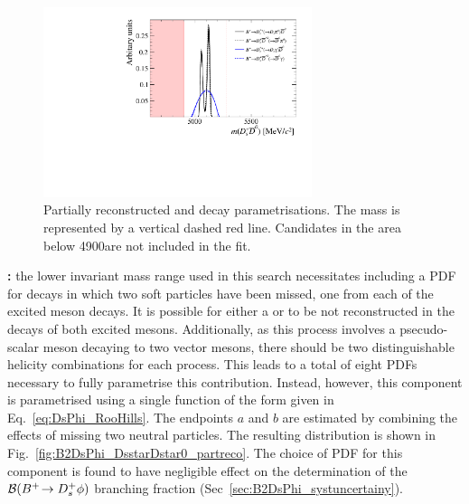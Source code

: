 \begin{figure}[!h]
    \centering
    \includegraphics[width=0.70\textwidth]{figs/B2DsPhi/DsD0_part_reco_Shapes.pdf}
    \caption{Partially reconstructed \decay{\Bp}{\Dsp\Dstarzb} and \decay{\Bp}{\Dssp\Dzb} decay parametrisations. The \Bp mass is represented by a vertical dashed red line. Candidates in the area below 4900\mevcc are not included in the fit.}
    \label{fig:B2DsPhi_DsD0_partreco}   
\end{figure}


\begin{description}

\item \textbf{\decay{\Bp}{\Dssp\Dstarzb}:} the lower invariant mass range used in this search necessitates including a PDF for \decay{\Bp}{\Dssp\Dstarzb} decays in which two soft particles have been missed, one from each of the excited \D meson decays. It is possible for either a \piz or \Pgamma to be not reconstructed in the decays of both excited \D mesons. Additionally, as this process involves a psecudo-scalar meson decaying to two vector mesons, there should be two distinguishable helicity combinations for each process. This leads to a total of eight PDFs necessary to fully parametrise this contribution. Instead, however, this component is parametrised using a single function of the form given in Eq.~\ref{eq:DsPhi_RooHills}. The endpoints $a$ and $b$ are estimated by combining the effects of missing two neutral particles. The resulting distribution is shown in Fig.~\ref{fig:B2DsPhi_DsstarDstar0_partreco}.
The choice of PDF for this component is found to have negligible effect on the determination of the ${\mathcal{B}}({{{B}^+}}\!\rightarrow {\ensuremath{{D}^+_{s}}}\phi)$ branching fraction (Sec~\ref{sec:B2DsPhi_systuncertainy}).

\end{description}

